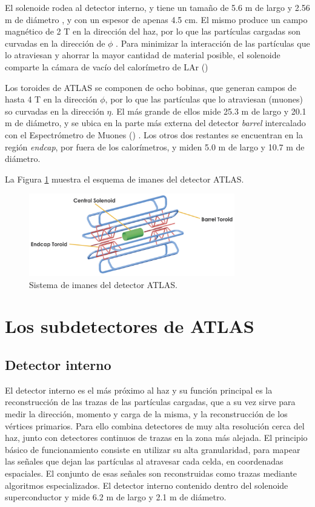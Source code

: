 El solenoide rodea al detector interno, y tiene un tamaño de 5.6 m de largo y 2.56 m de diámetro 
\commentNotaIV
, y con un espesor de apenas 4.5 cm. El mismo produce un campo magnético de 2 T en la dirección del haz, por lo que las partículas cargadas son curvadas en la dirección de $\phi$ 
. Para minimizar la interacción de las partículas que lo atraviesan y ahorrar la mayor cantidad de material posible, el solenoide comparte la cámara de vacío del calorímetro de LAr ()

Los toroides de ATLAS se componen de ocho bobinas, que generan campos de hasta 4 T 
en la dirección $\phi$, por lo que las partículas que lo atraviesan (muones) so curvadas en la dirección $\eta$. El más grande de ellos mide 25.3 m de largo y 20.1 m de diámetro, y se ubica en la parte más externa del detector \textit{barrel} intercalado con el Espectrómetro de Muones ()
. Los otros dos restantes se encuentran en la región \textit{endcap}, por fuera de los calorímetros, y miden 5.0 m de largo y 10.7 m de diámetro. 

La Figura \ref{magnet_1} muestra el esquema de imanes del detector ATLAS.

\begin{figure}
\centering
  \includegraphics[width=0.8\textwidth]{images/magnet_1.png}
  \caption{Sistema de imanes del detector ATLAS.}
  \label{magnet_1}
\end{figure}


\section{Los subdetectores de ATLAS}

\subsection{Detector interno}

El detector interno es el más próximo al haz y su función principal es la reconstrucción de las trazas de las partículas cargadas, que a su vez sirve para medir la dirección, momento y carga de la misma, y la reconstrucción de los vértices primarios. Para ello combina detectores de muy alta resolución cerca del haz, junto con detectores continuos de trazas en la zona más alejada. El principio básico de funcionamiento consiste en utilizar su alta granularidad, para mapear las señales que dejan las partículas al atravesar cada celda, en coordenadas espaciales. El conjunto de esas señales son reconstruidas como trazas mediante algoritmos especializados. El detector interno contenido dentro del solenoide superconductor y mide 6.2 m de largo y 2.1 m de diámetro. 

